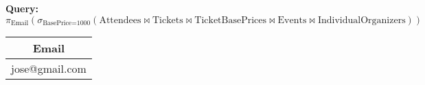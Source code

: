 \documentclass{article}
\begin{document}
\noindent \textbf{Query:} $\pi_{\text{Email}} \left( \sigma_{\text{BasePrice=1000}} \left( \text{Attendees} \bowtie \text{Tickets} \bowtie \text{TicketBasePrices} \bowtie \text{Events} \bowtie \text{IndividualOrganizers} \right) \right)$

\begin{center}
\begin{tabular}{c}
\toprule
\textbf{Email} \\
\midrule
jose@gmail.com \\
\bottomrule
\end{tabular}
\end{center}
\end{document}
